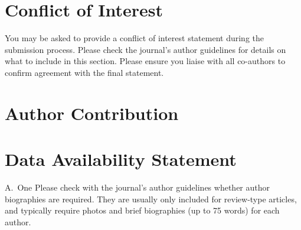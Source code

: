 \documentclass[alpha-refs]{wiley-article}
\begin{document}
\section*{Conflict of Interest}
You may be asked to provide a conflict of interest statement during the submission process. Please check the journal's author guidelines for details on what to include in this section. Please ensure you liaise with all co-authors to confirm agreement with the final statement.

\section*{Author Contribution}

\section*{Data Availability Statement}

\printendnotes



\begin{biography}{A.~One}
Please check with the journal's author guidelines whether author biographies are required. They are usually only included for review-type articles, and typically require photos and brief biographies (up to 75 words) for each author.
\bigskip
\bigskip
\end{biography}

\end{document}
